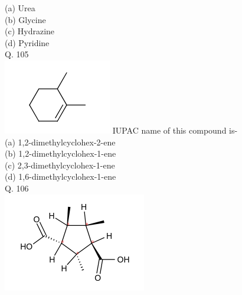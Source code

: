 \documentclass[10pt]{article}
\begin{document}
(a) Urea\\
(b) Glycine\\
(c) Hydrazine\\
(d) Pyridine\\
Q. 105\\
\includegraphics{smile-71d7df3468ad7eaf68652ae0b5f26ae7b496de3f} IUPAC name of this compound is-\\
(a) 1,2-dimethylcyclohex-2-ene\\
(b) 1,2-dimethylcyclohex-1-ene\\
(c) 2,3-dimethylcyclohex-1-ene\\
(d) 1,6-dimethylcyclohex-1-ene\\
Q. 106\\
\includegraphics{smile-64159fdf87822581f84dea0cfe2e54c46a9e75fc}
\end{document}
